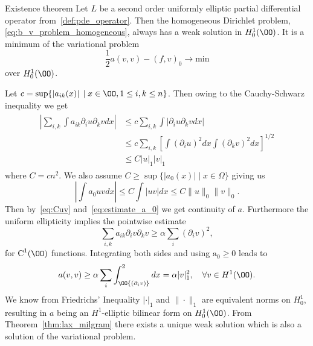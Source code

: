 \begin{thmx}{Existence theorem}
    Let $L$ be a second order uniformly elliptic partial differential operator from~\eqref{def:pde_operator}. Then the homogeneous Dirichlet problem,
     \eqref{eq:b_v_problem_homogeneous}, always has a weak solution in $H_0^1(\OO)$. It is a minimum of the variational problem
    \begin{equation}
        \frac{1}{2} a(v,v) - {(f, v)}_0 \rightarrow \text{min}
    \end{equation}
    over $H_0^1(\OO)$.\label{thm:existence_hom_dirichlet}
\end{thmx}

\begin{bev}
    Let $c = \sup\{\left| a_{ik}(x) \right| \; | \; x \in \OO, 1 \leq i,k \leq n\}$. Then owing to the Cauchy-Schwarz inequality we get
    \begin{align}
    \begin{split}
        \left| \sum_{i,k} \int a_{ik} \partial_i u \partial_k v dx \right| &\leq c \sum_{i,k} \int  \left|  \partial_i u \partial_k v dx\right|\\
        &\leq c \sum_{i,k} {\left[ \int {\left( \partial_i u \right)}^2 dx \int {\left( \partial_k v \right)}^2 dx  \right]}^{1/2} \\
        &\leq C {\left| u \right|}_1 {\left| v \right|}_1 \label{eq:Cuv}
    \end{split}
    \end{align}
    where $C=cn^2$. 
    We also assume $C\geq \sup\{|a_0(x)| \; | \; x\in \Omega\}$ giving us
    \begin{equation}
        \left|\int a_0 u v dx \right| \leq C \int |u v| dx \leq C \|u\|_0 \|v\|_0.  
        \label{eq:estimate_a_0}   
    \end{equation}
    Then by~\eqref{eq:Cuv} and~\eqref{eq:estimate_a_0} we get continuity of $a$.
    Furthermore the uniform ellipticity implies the pointwise estimate %
    \[
        \sum_{i,k} a_{ik} \partial_i v \partial_k v \geq \alpha \sum_i {\left( \partial_i v \right)}^2,
    \]
    for $\text{C}^1(\OO)$ functions. Integrating both sides and using $\text{a}_0 \geq 0$ leads to %
    \begin{equation}
        a(v,v) \geq \alpha \sum_i \int_\OO {\left(\partial_i v\right)}^2 dx = \alpha |v|^2_1, \quad \forall v \in H^1(\OO).
        \label{eq:alpha_ellipticity}
    \end{equation}
    We know from Friedrichs' Inequality $|\cdot|_1$ and $\| \cdot \|_1$ are equivalent norms on $H_0^1$,
     resulting in $a$ being an $H^1$-elliptic bilinear form on $H_0^1(\OO)$.
    From Theorem~\ref{thm:lax_milgram} there exists a unique weak solution which is also a solution of the variational problem.
\end{bev}